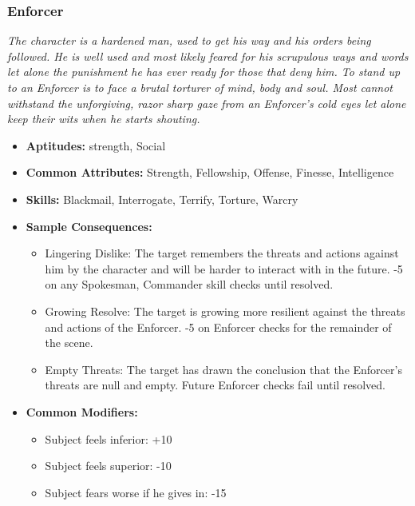 \subsubsection{Enforcer}\label{Enforcer}
\textit{The character is a hardened man, used to get his way and his orders being followed. 
He is well used and most likely feared for his scrupulous ways and words let alone the punishment he has ever ready for those that deny him.
To stand up to an Enforcer is to face a brutal torturer of mind, body and soul. 
Most cannot withstand the unforgiving, razor sharp gaze from an Enforcer's cold eyes let alone keep their wits when he starts shouting.}
\begin{itemize}
	\item \textbf{Aptitudes:} strength, Social
	\item \textbf{Common Attributes:} Strength, Fellowship, Offense, Finesse, Intelligence
	\item \textbf{Skills:} Blackmail, Interrogate, Terrify, Torture, Warcry
	\item \textbf{Sample Consequences:} 
	\begin{itemize}
		\item Lingering Dislike: The target remembers the threats and actions against him by the character and will be harder to interact with in the future. -5 on any Spokesman, Commander skill checks until resolved.
		\item Growing Resolve: The target is  growing more resilient against the threats and actions of the Enforcer. -5 on Enforcer checks for the remainder of the scene.
		\item Empty Threats: The target has drawn the conclusion that the Enforcer's threats are null and empty. Future Enforcer checks fail until resolved.
	\end{itemize}
	\item \textbf{Common Modifiers:}
	\begin{itemize}
		\item Subject feels inferior: +10
		\item Subject feels superior: -10
		\item Subject fears worse if he gives in: -15 
	\end{itemize}
\end{itemize}

